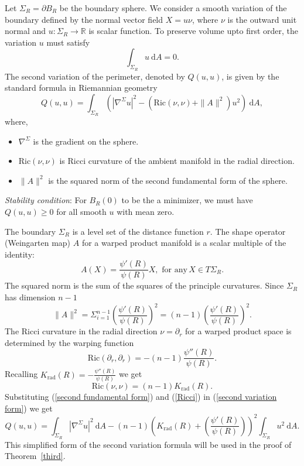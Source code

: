 \documentclass[a4paper,11pt,reqno]{amsart}
\renewcommand\eqref[1]{(\ref{#1})}
\theoremstyle{plain}
\numberwithin{equation}{section} \allowdisplaybreaks
\begin{document}
Let $\Sigma_R=\partial B_R$ be the boundary sphere. We consider a smooth variation of the boundary defined by the normal vector field $X=u\nu$, where $\nu$ is the outward unit normal and $u: \Sigma_R \to \mathbb{R}$ is scalar function. To preserve volume upto first order, the variation $u$ must satisfy 
\begin{equation*}
    \int_{\Sigma_R}u\ \mathrm{d}A=0.
\end{equation*}
The second variation of the perimeter, denoted by $Q(u,u)$, is given by the standard formula in Riemannian geometry
\begin{equation}\label{second variation form}
    Q(u,u)= \int_{\Sigma_R} (|\nabla^{\Sigma}u|^2-(\mathrm{Ric}(\nu,\nu)+\|A\|^2)u^2)\ \mathrm{d}A,
\end{equation}
where,
\begin{itemize}
    \item $\nabla^{\Sigma}$ is the gradient on the sphere.
    \item $\text{Ric}(\nu,\nu)$ is Ricci curvature of the ambient manifold in the radial direction.
    \item $\|A\|^2$ is the squared norm of the second fundamental form of the sphere.
\end{itemize}
\textit{Stability condition}: For $B_R(0)$ to be the a minimizer, we must have $Q(u,u) \geq 0$ for all smooth $u$ with mean zero.\par The boundary $\Sigma_R$ is a level set of the distance function $r$. The shape operator (Weingarten map) $A$ for a warped product manifold is a scalar multiple of the identity:\begin{equation*}
    A(X)=\frac{\psi'(R)}{\psi(R)}X,\,\, \text{for any}\, X\in T\Sigma_R.
\end{equation*}
The squared norm is the sum of the squares of the principle curvatures. Since $\Sigma_R$ has dimension $n-1$
\begin{equation}\label{second fundamental form}
    \|A\|^2=\Sigma_{i=1}^{n-1}\left(\frac{\psi'(R)}{\psi(R)}\right)^2=(n-1)\left(\frac{\psi'(R)}{\psi(R)}\right)^2.
\end{equation}
The Ricci curvature in the radial direction $\nu=\partial_r$ for a warped product space is determined by the warping function
\begin{equation*}
    \text{Ric}(\partial_r,\partial_r)=-(n-1)\frac{\psi''(R)}{\psi(R)}.
\end{equation*}
Recalling $K_{\text{rad}}(R)=-\frac{\psi''(R)}{\psi(R)}$ we get
\begin{equation}\label{Ricci}
    \text{Ric}(\nu,\nu)=(n-1)K_{\mathrm{rad}}(R).
\end{equation}
Substituting \eqref{second fundamental form} and \eqref{Ricci} in \eqref{second variation form} we get
\begin{equation}\label{simplified second variation}
    Q(u,u)=\int_{\Sigma_R}|\nabla^{\Sigma}u|^2 \ \mathrm{d}A-(n-1)\left(K_{\text{rad}}(R)+\left(\frac{\psi'(R)}{\psi(R)}\right)\right)^2\int_{\Sigma_R}u^2\ \mathrm{d}A.
\end{equation}
This simplified form of the second variation formula will be used in the proof of Theorem~\ref{third}.
\end{document}
